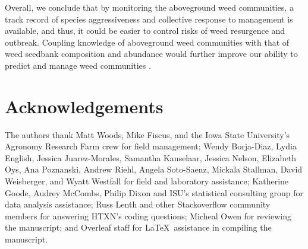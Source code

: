 \documentclass[
]{article}
\begin{document}
Overall, we conclude that by monitoring the aboveground weed communities, a track record of species aggressiveness and collective response to management is available, and thus, it could be easier to control risks of weed resurgence and outbreak. Coupling knowledge of aboveground weed communities with that of weed seedbank composition and abundance would further improve our ability to predict and manage weed communities \citep{forcellaWeedSeedbanksCorn1992, menalledWeedAbovegroundSeedbank2001, forcellaDebitingSeedbankPriorities2003, davisWeedSeedbankCommunity2005}.

\hypertarget{acknowledgements}{%
\section*{Acknowledgements}\label{acknowledgements}}

The authors thank Matt Woods, Mike Fiscus, and the Iowa State University's Agronomy Research Farm crew for field management; Wendy Borja-Diaz, Lydia English, Jessica Juarez-Morales, Samantha Kanselaar, Jessica Nelson, Elizabeth Oys, Ana Poznanski, Andrew Riehl, Angela Soto-Saenz, Mickala Stallman, David Weisberger, and Wyatt Westfall for field and laboratory assistance; Katherine Goode, Audrey McCombs, Philip Dixon and ISU's statistical consulting group for data analysis assistance; Russ Lenth and other Stackoverflow community members for answering HTXN's coding questions; Micheal Owen for reviewing the manuscript; and Overleaf staff for \LaTeX~assistance in compiling the manuscript.

\renewcommand\refname{References}
  
\end{document}
